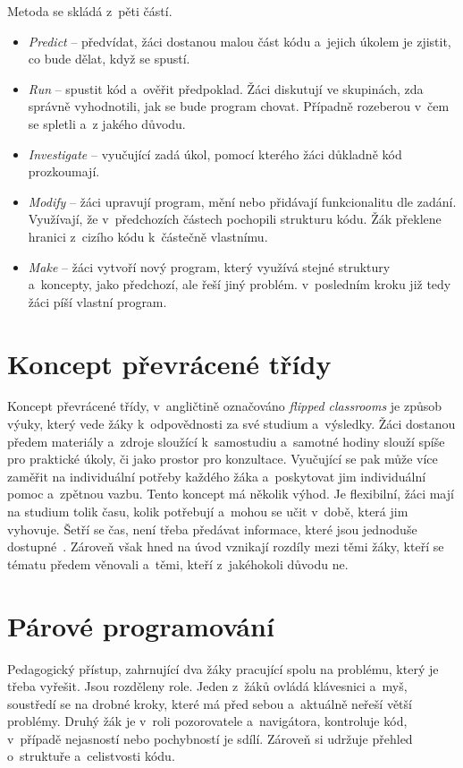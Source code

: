 \documentclass[
  digital,     %
  oneside,     %
  nosansbold,  %
  colorbold, %
  lof,         %
  nolot,         %
]{fithesis4}
\begin{document}
Metoda se skládá z~pěti částí. 
\begin{itemize}
\item \textit{Predict} -- předvídat, žáci dostanou malou část kódu a~jejich úkolem je zjistit, co bude dělat, když se spustí. 
\item \textit{Run} -- spustit kód a~ověřit předpoklad. Žáci diskutují ve skupinách, zda správně vyhodnotili, jak se bude program chovat. Případně rozeberou v~čem se spletli a~z jakého důvodu. 
\item \textit{Investigate} -- vyučující zadá úkol, pomocí kterého žáci důkladně kód prozkoumají. 
\item \textit{Modify} -- žáci upravují program, mění nebo přidávají funkcionalitu dle zadání. Využívají, že v~předchozích částech pochopili strukturu kódu. Žák překlene hranici z~cizího kódu k~částečně vlastnímu. 
\item \textit{Make} -- žáci vytvoří nový program, který využívá stejné struktury a~koncepty, jako předchozí, ale řeší jiný problém. v~posledním kroku již tedy žáci píší vlastní program.
\end{itemize}

\section{Koncept převrácené třídy}
Koncept převrácené třídy, v~angličtině označováno \textit{flipped classrooms} je způsob výuky, který vede žáky k~odpovědnosti za své studium a~výsledky. 
Žáci dostanou předem materiály a~zdroje sloužící k~samostudiu a~samotné hodiny slouží spíše pro praktické úkoly, či jako prostor pro konzultace. Vyučující se pak může více zaměřit na individuální potřeby každého žáka a~poskytovat jim individuální pomoc a~zpětnou vazbu.
Tento koncept má několik výhod. Je flexibilní, žáci mají na studium tolik času, kolik potřebují a~mohou se učit v~době, která jim vyhovuje. Šetří se čas, není třeba předávat informace, které jsou jednoduše dostupné~\cite{mazur09}. Zároveň však hned na úvod vznikají rozdíly mezi těmi žáky, kteří se tématu předem věnovali a~těmi, kteří z~jakéhokoli důvodu ne.

\section{Párové programování}
Pedagogický přístup, zahrnující dva žáky pracující spolu na problému, který je třeba vyřešit. Jsou rozděleny role. Jeden z~žáků ovládá klávesnici a~myš, soustředí se na drobné kroky, které má před sebou a~aktuálně neřeší větší problémy. Druhý žák je v~roli pozorovatele a~navigátora, kontroluje kód, v~případě nejasností nebo pochybností je sdílí. Zároveň si udržuje přehled o~struktuře a~celistvosti kódu.
\end{document}
